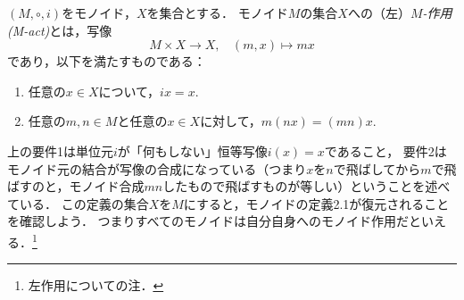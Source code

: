 \documentclass[11pt,a4paper]{jsarticle}
\begin{document}
\begin{dfn}
 $(M, \circ, i)$をモノイド，$X$を集合とする．
 モノイド$M$の集合$X$への（左）\emph{$M$-作用(M-act)}とは，写像
 \[
  M \times X \to X, \ \ \ \ (m, x) \mapsto mx
 \]
 であり，以下を満たすものである：
 \begin{enumerate}
  \item 任意の$x \in X$について，$ix = x$.
  \item 任意の$m, n \in M$と任意の$x \in X$に対して，$m(nx) = (mn)x$.
 \end{enumerate}
\end{dfn}
上の要件1は単位元$i$が「何もしない」恒等写像$i(x)=x$であること，
要件2はモノイド元の結合が写像の合成になっている（つまり$x$を$n$で飛ばしてから$m$で飛ばすのと，モノイド合成$mn$したもので飛ばすものが等しい）ということを述べている．
この定義の集合$X$を$M$にすると，モノイドの定義2.1が復元されることを確認しよう．
つまりすべてのモノイドは自分自身へのモノイド作用だといえる．\footnote{左作用についての注．}
\end{document}
